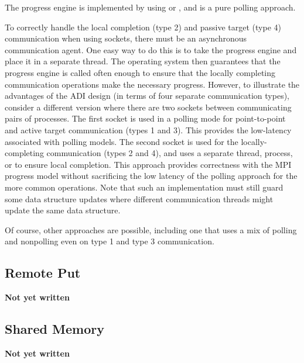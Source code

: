 The progress engine is implemented by using  or , and
is a pure polling approach. 

To correctly handle the local completion (type 2) and passive target
(type 4) communication when using sockets, there must be an
asynchronous communication agent.  One easy way to do this is to take
the progress engine and place it in a separate thread.  The operating
system then guarantees that the progress engine is called often enough
to ensure that the locally completing communication operations make
the necessary progress.  However, to illustrate the advantages of the
ADI design (in terms of four separate communication types), consider a
different version where there are two sockets   
between communicating pairs of processes.  The first socket is used in
a polling mode for point-to-point and active target communication
(types 1 and 3).  This provides the low-latency associated with
polling models.  The second socket is used for the locally-completing
communication (types 2 and 4), and uses a separate thread, process, or
 to ensure local completion.  This approach provides correctness
with the MPI progress model without sacrificing the low latency of the
polling approach for the more common operations.  Note that such an
implementation must still guard some data structure updates where
different communication threads might update the same data structure.

Of course, other approaches are possible, including one that uses a
mix of polling and nonpolling even on type 1 and type 3 communication.

\subsection{Remote Put}
\textbf{Not yet written}

\subsection{Shared Memory}
\textbf{Not yet written}



